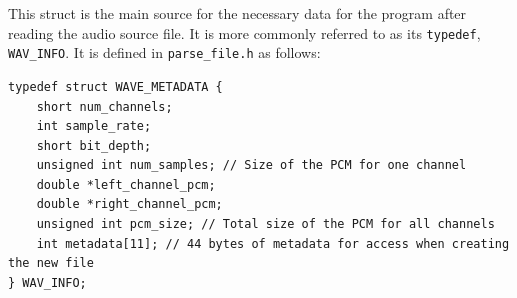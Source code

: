 \documentclass[11pt]{extarticle}
\begin{document}
This struct is the main source for the necessary data for the program after reading the audio source file. It is more commonly referred to as its \texttt{typedef}, \texttt{WAV\_INFO}. It is defined in \texttt{parse\_file.h} as follows:

\begin{verbatim}
typedef struct WAVE_METADATA {
    short num_channels;
    int sample_rate;
    short bit_depth;
    unsigned int num_samples; // Size of the PCM for one channel
    double *left_channel_pcm;
    double *right_channel_pcm;
    unsigned int pcm_size; // Total size of the PCM for all channels
    int metadata[11]; // 44 bytes of metadata for access when creating the new file
} WAV_INFO;
\end{verbatim}
\end{document}
